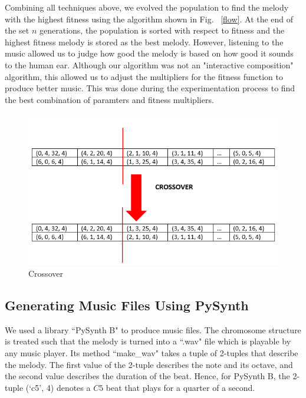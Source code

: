 \documentclass[conference]{IEEEtran}
\begin{document}
Combining all techniques above, we evolved the population to find the melody with the highest fitness using the algorithm shown in Fig. ~\ref{flow}. At the end of the set $n$ generations, the population is sorted with respect to fitness and the highest fitness melody is stored as the best melody. However, listening to the music allowed us to judge how good the melody is based on how good it sounds to the human ear. Although our algorithm was not an "interactive composition" algorithm, this allowed us to adjust the multipliers for the fitness function to produce better music. This was done during the experimentation process to find the best combination of paramters and fitness multipliers.
\begin{figure}
\includegraphics[width=9 cm, height= 9 cm ]{crossover.png}
\caption{ Crossover}
\end{figure}

\subsection{Generating Music Files Using PySynth}
We used a library ``PySynth B" to produce music files. The chromosome structure is treated such that the melody is turned into a ``.wav" file which is playable by any music player. Its method ``make\_wav" takes a tuple of 2-tuples that describe the melody. The first value of the 2-tuple describes the note and its octave, and the second value describes the duration of the beat. Hence, for PySynth B, the 2-tuple (`c5', 4) denotes a $C5$ beat that plays for a quarter of a second.
\end{document}
